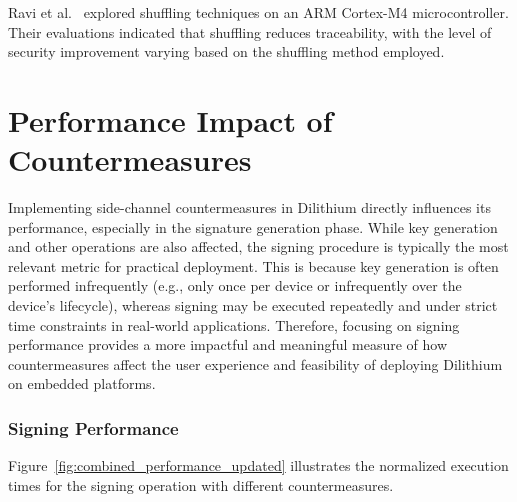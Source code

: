 Ravi et al.~\cite{Ravi20} explored shuffling techniques on an ARM Cortex-M4 microcontroller. Their evaluations indicated that shuffling reduces traceability, with the level of security improvement varying based on the shuffling method employed.

\section{Performance Impact of Countermeasures}

Implementing side-channel countermeasures in Dilithium directly influences its performance, especially in the signature generation phase. While key generation and other operations are also affected, the signing procedure is typically the most relevant metric for practical deployment. This is because key generation is often performed infrequently (e.g., only once per device or infrequently over the device's lifecycle), whereas signing may be executed repeatedly and under strict time constraints in real-world applications. Therefore, focusing on signing performance provides a more impactful and meaningful measure of how countermeasures affect the user experience and feasibility of deploying Dilithium on embedded platforms.

\subsubsection{Signing Performance}

Figure~\ref{fig:combined_performance_updated} illustrates the normalized execution times for the signing operation with different countermeasures.

